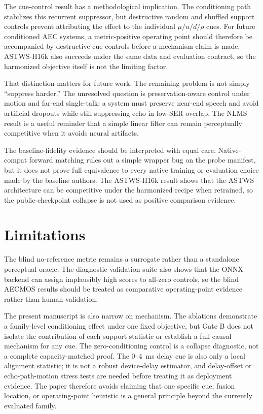 \documentclass[journal]{IEEEtran}
\begin{document}
The cue-control result has a methodological implication. The conditioning path stabilizes this recurrent suppressor, but destructive random and shuffled support controls prevent attributing the effect to the individual $\mu/u/d/\rho$ cues. For future conditioned AEC systems, a metric-positive operating point should therefore be accompanied by destructive cue controls before a mechanism claim is made. ASTWS-H16k also succeeds under the same data and evaluation contract, so the harmonized objective itself is not the limiting factor.

That distinction matters for future work. The remaining problem is not simply ``suppress harder.'' The unresolved question is preservation-aware control under motion and far-end single-talk: a system must preserve near-end speech and avoid artificial dropouts while still suppressing echo in low-SER overlap. The NLMS result is a useful reminder that a simple linear filter can remain perceptually competitive when it avoids neural artifacts.

The baseline-fidelity evidence should be interpreted with equal care. Native-compat forward matching rules out a simple wrapper bug on the probe manifest, but it does not prove full equivalence to every native training or evaluation choice made by the baseline authors. The ASTWS-H16k result shows that the ASTWS architecture can be competitive under the harmonized recipe when retrained, so the public-checkpoint collapse is not used as positive comparison evidence.

\section{Limitations}
The blind no-reference metric remains a surrogate rather than a standalone perceptual oracle. The diagnostic validation suite also shows that the ONNX backend can assign implausibly high scores to all-zero controls, so the blind AECMOS results should be treated as comparative operating-point evidence rather than human validation.

The present manuscript is also narrow on mechanism. The ablations demonstrate a family-level conditioning effect under one fixed objective, but Gate B does not isolate the contribution of each support statistic or establish a full causal mechanism for any cue. The zero-conditioning control is a collapse diagnostic, not a complete capacity-matched proof. The 0--4~ms delay cue is also only a local alignment statistic; it is not a robust device-delay estimator, and delay-offset or echo-path-motion stress tests are needed before treating it as deployment evidence. The paper therefore avoids claiming that one specific cue, fusion location, or operating-point heuristic is a general principle beyond the currently evaluated family.
\end{document}
